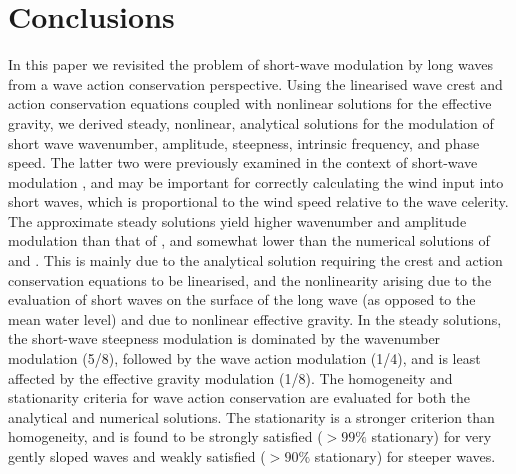 \documentclass[lineno]{jfm}
\begin{document}
\section{Conclusions}
\label{section:conclusions}

In this paper we revisited the problem of short-wave modulation by long waves
from a wave action conservation perspective.
Using the linearised wave crest and action conservation equations coupled with
nonlinear solutions for the effective gravity, we derived steady, nonlinear, analytical
solutions for the modulation of short wave wavenumber, amplitude, steepness,
intrinsic frequency, and phase speed.
The latter two were previously examined in the context of short-wave
modulation \citep{longuet1962resonant,longuet1962phase}, and may be important
for correctly calculating the wind input into short waves, which is proportional
to the wind speed relative to the wave celerity.
The approximate steady solutions yield higher wavenumber and amplitude
modulation than that of \citet{longuet1960changes}, and somewhat lower than 
the numerical solutions of \citet{longuet1987propagation} and
\citet{zhang1990evolution}.
This is mainly due to the analytical solution requiring the crest and action
conservation equations to be linearised, and the nonlinearity arising due
to the evaluation of short waves on the surface of the long wave (as opposed to
the mean water level) and due to nonlinear effective gravity.
In the steady solutions, the short-wave steepness modulation is dominated by
the wavenumber modulation (5/8), followed by the wave action modulation (1/4),
and is least affected by the effective gravity modulation (1/8).
The homogeneity and stationarity criteria for wave action conservation are
evaluated for both the analytical and numerical solutions.
The stationarity is a stronger criterion than homogeneity, and is found to be
strongly satisfied ($> 99\%$ stationary) for very gently sloped waves and weakly
satisfied ($> 90\%$ stationary) for steeper waves.
\end{document}
